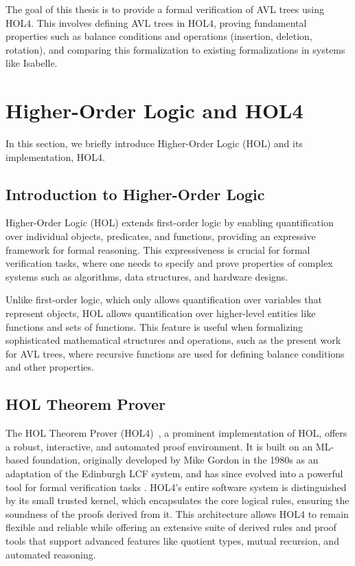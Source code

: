 \documentclass[12pt]{article}
\begin{document}
The goal of this thesis is to provide a formal verification of AVL trees using HOL4. This involves defining AVL trees in HOL4, proving fundamental properties such as balance conditions and operations (insertion, deletion, rotation), and comparing this formalization to existing formalizations in systems like Isabelle.

\section{Higher-Order Logic and HOL4}

In this section, we briefly introduce Higher-Order Logic (HOL) and its implementation, HOL4.

\subsection{Introduction to Higher-Order Logic}

Higher-Order Logic (HOL) extends first-order logic by enabling quantification over individual objects, predicates, and functions, providing an expressive framework for formal reasoning. This expressiveness is crucial for formal verification tasks, where one needs to specify and prove properties of complex systems such as algorithms, data structures, and hardware designs.

Unlike first-order logic, which only allows quantification over variables that represent objects, HOL allows quantification over higher-level entities like functions and sets of functions. This feature is useful when formalizing sophisticated mathematical structures and operations, such as the present work for AVL trees, where recursive functions are used for defining balance conditions and other properties.

\subsection{HOL Theorem Prover}

The HOL Theorem Prover (HOL4)~\cite{gordon2008hol4}, a prominent implementation of HOL, offers a robust, interactive, and automated proof environment. It is built on an ML-based foundation, originally developed by Mike Gordon in the 1980s as an adaptation of the Edinburgh LCF system, and has since evolved into a powerful tool for formal verification tasks \cite{gordon1993introduction}. HOL4’s entire software system is distinguished by its small trusted kernel, which encapsulates the core logical rules, ensuring the soundness of the proofs derived from it. This architecture allows HOL4 to remain flexible and reliable while offering an extensive suite of derived rules and proof tools that support advanced features like quotient types, mutual recursion, and automated reasoning.
\end{document}
